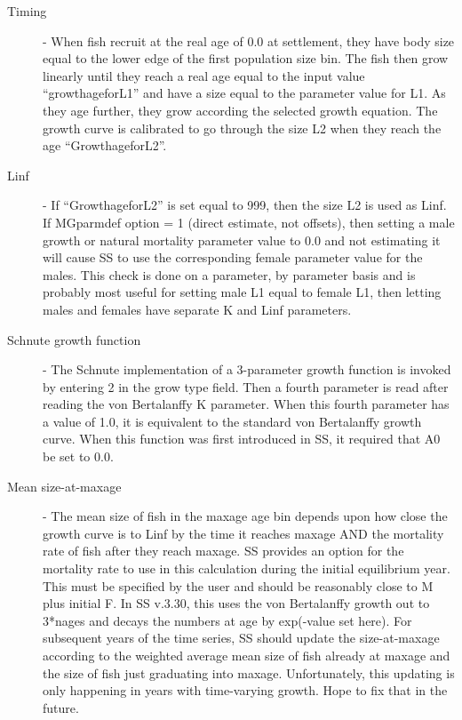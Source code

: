 \begin{description}
	\item [Timing] - When fish recruit at the real age of 0.0 at settlement, they have body size equal to the lower edge of the first population size bin.  The fish then grow linearly until they reach a real age equal to the input value “growth\textunderscore age\textunderscore for\textunderscore L1” and have a size equal to the parameter value for L1.  As they age further, they grow according the selected growth equation.  The growth curve is calibrated to go through the size L2 when they reach the age “Growth\textunderscore age\textunderscore for\textunderscore L2”.
	\item  [Linf] - If “Growth\textunderscore age\textunderscore for\textunderscore L2” is set equal to 999, then the size L2 is used as Linf.  If MGparm\textunderscore def option = 1 (direct estimate, not offsets), then setting a male growth or natural mortality parameter value to 0.0 and not estimating it will cause SS to use the corresponding female parameter value for the males. This check is done on a parameter, by parameter basis and is probably most useful for setting male L1 equal to female L1, then letting males and females have separate K and Linf parameters.
	\item[Schnute growth function] - The Schnute implementation of a 3-parameter growth function is invoked by entering 2 in the grow type field.  Then a fourth parameter is read after reading the von Bertalanffy K parameter.  When this fourth parameter has a value of 1.0, it is equivalent to the standard von Bertalanffy growth curve.  When this function was first introduced in SS, it required that A0 be set to 0.0.
	\item[Mean size-at-maxage] - The mean size of fish in the maxage age bin depends upon how close the growth curve is to Linf by the time it reaches maxage AND the mortality rate of fish after they reach maxage.  SS provides an option for the mortality rate to use in this calculation during the initial equilibrium year.  This must be specified by the user and should be reasonably close to M plus initial F.  In SS v.3.30, this uses the von Bertalanffy growth out to 3*nages and decays the numbers at age by exp(-value set here). For subsequent years of the time series, SS should update the size-at-maxage according to the weighted average mean size of fish already at maxage and the size of fish just graduating into maxage.  Unfortunately, this updating is only happening in years with time-varying growth.  Hope to fix that in the future.

\end{description}
